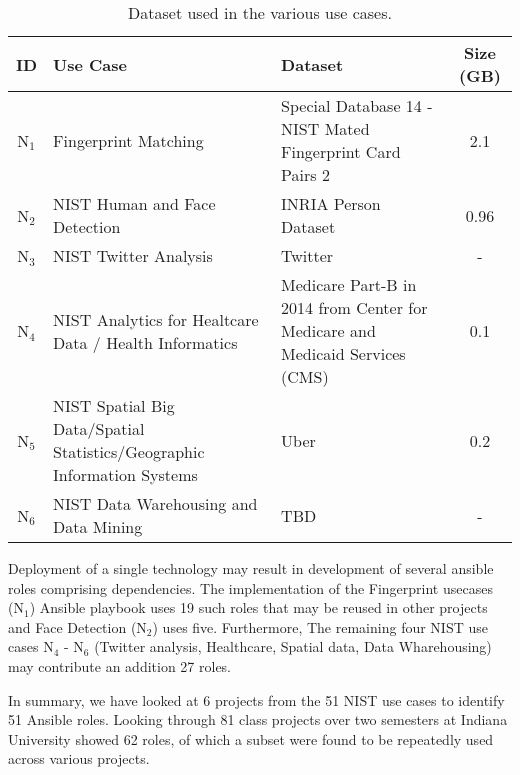 \begin{table*}[htb]
  \caption{Dataset used in the various use cases.}
  \bigskip
  \label{T:usecase2}
  \begin{center}
    \begin{tabular}{|c|p{}|p{}|c|}

      \hline

      ID    & Use Case                                                                & Dataset                                                                      & Size (GB) \tabularnewline \hline
      N$_1$ & Fingerprint Matching                                                    & Special Database 14 - NIST Mated Fingerprint Card Pairs 2                    & 2.1       \tabularnewline \hline
      N$_2$ & NIST Human and Face Detection                                           & INRIA Person Dataset                                                         & 0.96      \tabularnewline \hline
      N$_3$ & NIST Twitter Analysis                                                   & Twitter                                                                      & -         \tabularnewline \hline
      N$_4$ & NIST Analytics for Healtcare Data / Health Informatics                  & Medicare Part-B in 2014 from Center for Medicare and Medicaid Services (CMS) & 0.1       \tabularnewline \hline
      N$_5$ & NIST Spatial Big Data/Spatial Statistics/Geographic Information Systems & Uber                                                                         & 0.2       \tabularnewline \hline
      N$_6$ & NIST Data Warehousing and Data Mining                                   & TBD                                                                          & -         \tabularnewline \hline

    \end{tabular}
  \end{center}
\end{table*}


Deployment of a single technology may result in development of several ansible roles comprising dependencies.
The implementation of the Fingerprint usecases (N$_1$) Ansible playbook uses 19 such roles that may be reused in other projects and Face Detection (N$_2$) uses five.
Furthermore, The remaining four NIST use cases N$_4$ - N$_6$ (Twitter analysis, Healthcare, Spatial data, Data Wharehousing) may contribute an addition 27 roles.

In summary, we have looked at 6 projects from the 51 NIST use cases to identify 51 Ansible roles.
Looking through 81 class projects over two semesters at Indiana University showed 62 roles, of which a subset were found to be repeatedly used across various projects.


